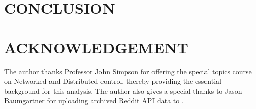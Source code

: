 \documentclass[letterpaper, 10 pt, conference]{ieeeconf}
\theoremstyle{definition}
\begin{document}
\section{CONCLUSION}









\section*{ACKNOWLEDGEMENT}
The author thanks Professor John Simpson for offering the special topics course on Networked and Distributed control, thereby providing the essential background for this analysis. The author also gives a special thanks to Jason Baumgartner for uploading archived Reddit API data to \cite{Software:RedditArchive}.


\end{document}
